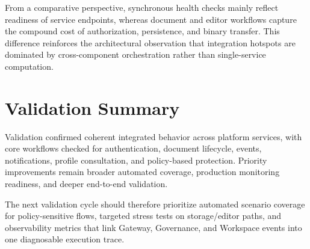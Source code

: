 From a comparative perspective, synchronous health checks mainly reflect
readiness of service endpoints, whereas document and editor workflows capture
the compound cost of authorization, persistence, and binary transfer. This
difference reinforces the architectural observation that integration hotspots
are dominated by cross-component orchestration rather than single-service
computation.

\section{Validation Summary}

Validation confirmed coherent integrated behavior across platform services, with
core workflows checked for authentication, document lifecycle, events,
notifications, profile consultation, and policy-based protection. Priority
improvements remain broader automated coverage, production monitoring readiness,
and deeper end-to-end validation.

The next validation cycle should therefore prioritize automated scenario
coverage for policy-sensitive flows, targeted stress tests on storage/editor
paths, and observability metrics that link Gateway, Governance, and Workspace
events into one diagnosable execution trace.
